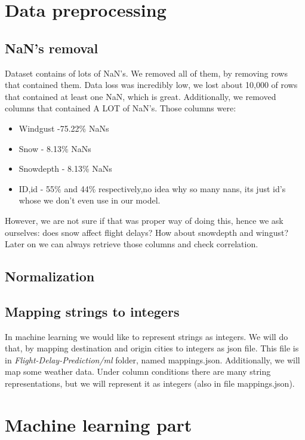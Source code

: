 \documentclass{article}
\begin{document}
\newpage
\section{Data preprocessing}

\subsection{NaN's removal}
Dataset contains of lots of NaN's. We removed all of them, by removing rows that contained them. Data loss
was incredibly low, we lost about 10,000 of rows that contained at least one NaN, which is great. Additionally,
we removed columns that contained A LOT of NaN's. Those columns were:
	\begin{itemize}
		\item Windgust -75.22\% NaNs
		\item Snow - 8.13\% NaNs
		\item Snowdepth - 8.13\% NaNs
		\item ID,id - 55\% and 44\% respectively,no idea why so many nans, its just id's whose we don't even use in our model.
	\end{itemize}

However, we are not sure if that was proper way of doing this, hence we ask ourselves: does snow affect flight delays? How about snowdepth and wingust? Later on we can always retrieve those columns and check correlation.

\subsection{Normalization}


\subsection{Mapping strings to integers}
In machine learning we would like to represent strings as integers. We will do that, by mapping destination and origin cities to integers
as json file. This file is in \textit{Flight-Delay-Prediction/ml} folder, named mappings.json. Additionally, we will map some weather data. Under column conditions there are many string representations, but we will represent it as integers (also in file mappings.json).


\section{Machine learning part}
\end{document}
